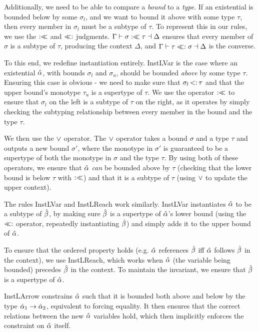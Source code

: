 \documentclass{sig-alternate}
\begin{document}
Additionally, we need to be able to compare a \emph{bound} to a \emph{type}. If an existential is bounded below by some $\sigma_l$, and we want to bound it above with some type $\tau$, then every member in $\sigma_l$ must be a subtype of $\tau$. To represent this in our rules, we use the $:\ll$ and $\ll:$ judgments. $\Gamma \vdash \sigma :\ll \tau \dashv \Delta$ ensures that every member of $\sigma$ is a subtype of $\tau$, producing the context $\Delta$, and $\Gamma \vdash \tau \ll: \sigma \dashv \Delta$ is the converse.
\begin{figure}[h]
\small

\end{figure}

To this end, we redefine instantiation entirely. InstLVar is the case where an existential $\hat{\alpha}$, with bounds $\sigma_l$ and $\sigma_u$, should be bounded \emph{above} by some type $\tau$. Ensuring this case is obvious - we need to make sure that $\sigma_l \st \tau$ and that the upper bound's monotype $\tau_u$ is a supertype of $\tau$. We use the operator $:\ll$ to ensure that $\sigma_l$ on the left is a subtype of $\tau$ on the right, as it operates by simply checking the subtyping relationship between every member in the bound and the type $\tau$.

We then use the $\vee$ operator. The $\vee$ operator takes a bound $\sigma$ and a type $\tau$ and outputs a new bound $\sigma'$, where the monotype in $\sigma'$ is guaranteed to be a supertype of both the monotype in $\sigma$ and the type $\tau$. By using both of these operators, we ensure that $\hat{\alpha}$ \emph{can} be bounded above by $\tau$ (checking that the lower bound is below $\tau$ with $:\ll$) and that it is a subtype of $\tau$ (using $\vee$ to update the upper context).

The rules InstLVar and InstLReach work similarly. InstLVar instantiates $\hat{\alpha}$ to be a subtype of $\hat{\beta}$, by making sure $\hat{\beta}$ is a supertype of $\hat{\alpha}$'s lower bound (using the $\ll:$ operator, repeatedly instantiating $\hat{\beta}$) and simply adds it to the upper bound of $\hat{\alpha}$.

To ensure that the ordered property holds (e.g. $\hat{\alpha}$ references $\hat{\beta}$ iff $\hat{\alpha}$ follows $\hat{\beta}$ in the context), we use InstLReach, which works when $\hat{\alpha}$ (the variable being bounded) precedes $\hat{\beta}$ in the context. To maintain the invariant, we ensure that $\hat{\beta}$ is a supertype of $\hat{\alpha}$.

InstLArrow constrains $\hat{\alpha}$ such that it is bounded both above and below by the type $\hat{\alpha}_1 \rightarrow \hat{\alpha}_2$, equivalent to forcing equality. It then ensures that the correct relations between the new $\hat{\alpha}$ variables hold, which then implicitly enforces the constraint on $\hat{\alpha}$ itself.
\end{document}
